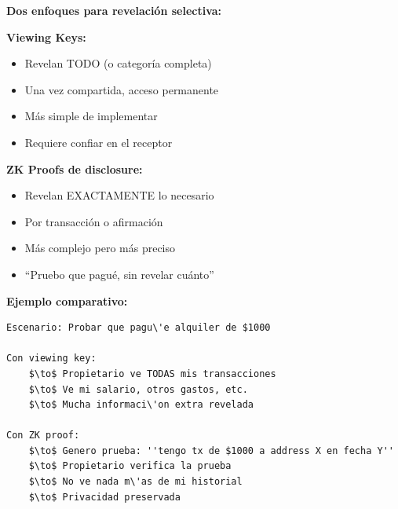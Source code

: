 \documentclass[11pt,a4paper,twoside]{book}
\begin{document}
\begin{remark}
\textbf{Dos enfoques para revelaci\'on selectiva:}

\textbf{Viewing Keys:}
\begin{itemize}
    \item Revelan TODO (o categor\'ia completa)
    \item Una vez compartida, acceso permanente
    \item M\'as simple de implementar
    \item Requiere confiar en el receptor
\end{itemize}

\textbf{ZK Proofs de disclosure:}
\begin{itemize}
    \item Revelan EXACTAMENTE lo necesario
    \item Por transacci\'on o afirmaci\'on
    \item M\'as complejo pero m\'as preciso
    \item ``Pruebo que pagu\'e, sin revelar cu\'anto''
\end{itemize}

\textbf{Ejemplo comparativo:}
\begin{verbatim}
Escenario: Probar que pagu\'e alquiler de $1000

Con viewing key:
    $\to$ Propietario ve TODAS mis transacciones
    $\to$ Ve mi salario, otros gastos, etc.
    $\to$ Mucha informaci\'on extra revelada

Con ZK proof:
    $\to$ Genero prueba: ''tengo tx de $1000 a address X en fecha Y''
    $\to$ Propietario verifica la prueba
    $\to$ No ve nada m\'as de mi historial
    $\to$ Privacidad preservada
\end{verbatim}
\end{remark}
\end{document}
